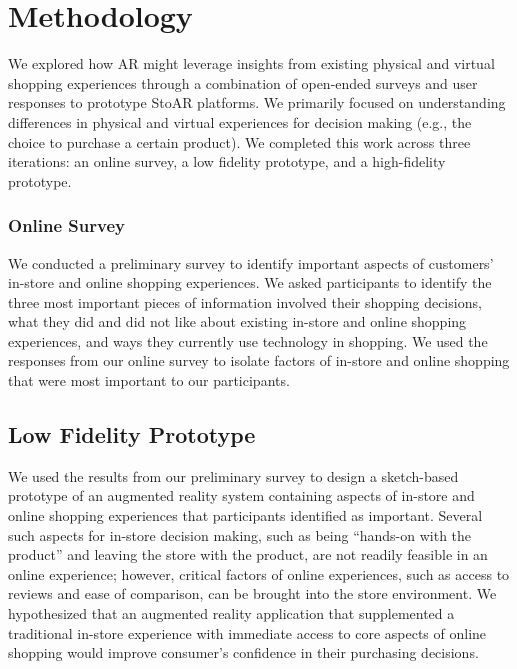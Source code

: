\section{Methodology}

We explored how AR might leverage insights from existing physical and virtual shopping experiences through a combination of open-ended surveys and user responses to prototype StoAR platforms. We primarily focused on understanding differences in physical and virtual experiences for decision making (e.g., the choice to purchase a certain product). We completed this work across three iterations: an online survey, a low fidelity prototype, and a high-fidelity prototype.

\subsubsection{Online Survey}
We conducted a preliminary survey to identify important aspects of customers' in-store and online shopping experiences. We asked participants
to identify the three most important pieces of information involved their shopping decisions, what they did and did not like about existing in-store and online shopping experiences, and ways they currently use technology in shopping.   
We used the responses from our online survey to isolate factors of in-store and online shopping that were most important to our participants.   

\subsection{Low Fidelity Prototype}
We used the results from our preliminary survey to design a sketch-based prototype of an augmented reality system containing aspects of in-store and online shopping experiences that participants identified as important. Several such aspects for in-store decision making, such as being ``hands-on with the product'' and leaving the store with the product, are not readily feasible in an online experience; however, critical factors of online experiences, such as access to reviews and ease of comparison, can be brought into the store environment. We hypothesized that an augmented reality application that supplemented a traditional in-store experience with immediate access to core aspects of online shopping would improve consumer's confidence in their purchasing decisions. 

